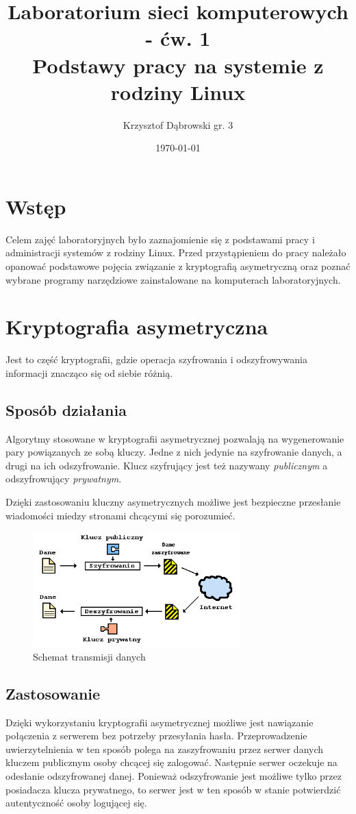 \documentclass{article}
\title{Laboratorium sieci komputerowych - ćw. 1 \\ Podstawy pracy na systemie z rodziny Linux}
\author{Krzysztof Dąbrowski gr. 3}
\date{\today}
\begin{document}
\maketitle{}
\tableofcontents{}
\newpage

\section{Wstęp}
Celem zajęć laboratoryjnych było zaznajomienie się z podstawami pracy i administracji systemów z rodziny Linux. Przed przystąpieniem do pracy należało opanować podstawowe pojęcia związanie z kryptografią asymetryczną oraz poznać wybrane programy narzędziowe zainstalowane na komputerach laboratoryjnych.

\section{Kryptografia asymetryczna}
Jest to część kryptografii, gdzie operacja szyfrowania i odszyfrowywania informacji znacząco się od siebie różnią.

\subsection{Sposób działania}
Algorytmy stosowane w kryptografii asymetrycznej pozwalają na wygenerowanie pary powiązanych ze sobą kluczy. Jedne z nich jedynie na szyfrowanie danych, a drugi na ich odszyfrowanie. Klucz szyfrujący jest też nazywany \textit{publicznym} a odszyfrowujący \textit{prywatnym}.

Dzięki zastosowaniu kluczny asymetrycznych możliwe jest bezpieczne przesłanie wiadomości miedzy stronami chcącymi się porozumieć.

\begin{figure}[h]
    \centering
    \includegraphics[width=8cm]{schemat_szyfrowania_asymetrycznego}
    \caption{Schemat transmisji danych}
\end{figure}

\subsection{Zastosowanie}
Dzięki wykorzystaniu kryptografii asymetrycznej możliwe jest nawiązanie połączenia z serwerem bez potrzeby przesyłania hasła. Przeprowadzenie uwierzytelnienia w ten sposób polega na zaszyfrowaniu przez serwer danych kluczem publicznym osoby chcącej się zalogować. Następnie serwer oczekuje na odesłanie odszyfrowanej danej. Ponieważ odszyfrowanie jest możliwe tylko przez posiadacza klucza prywatnego, to serwer jest w ten sposób w stanie potwierdzić autentyczność osoby logującej się.
\end{document}
